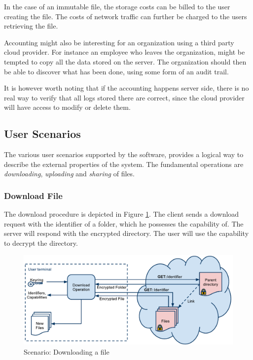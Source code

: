 \documentclass[pdftex,english,10pt,b5paper,twoside]{book}
\begin{document}
In the case of an immutable file, the storage costs can be billed to the user
creating the file. The costs of network traffic can further be charged to the
users retrieving the file.

Accounting might also be interesting for an organization using a third party
cloud provider. For instance an employee who leaves the organization, might be
tempted to copy all the data stored on the server. The organization should then
be able to discover what has been done, using some form of an audit trail.

It is however worth noting that if the accounting happens server side, there is
no real way to verify that all logs stored there are correct, since the cloud
provider will have access to modify or delete them.

\subsection{User Scenarios}

The various user scenarios supported by the software, provides a logical way to
describe the external properties of the system. The fundamental operations are
\emph{downloading}, \emph{uploading} and \emph{sharing} of files.

\subsubsection{Download File}

The download procedure is depicted in Figure \ref{fig:AS:download}. The client
sends a download request with the identifier of a folder, which he possesses
the capability of. The server will respond with the encrypted directory.
The user will use the capability to decrypt the directory.

\begin{figure}[h!]
    \centering
    \includegraphics[width=\columnwidth]{ArchitectureDownload.pdf}
    \caption{Scenario: Downloading a file}
    \label{fig:AS:download}
\end{figure}
\end{document}
